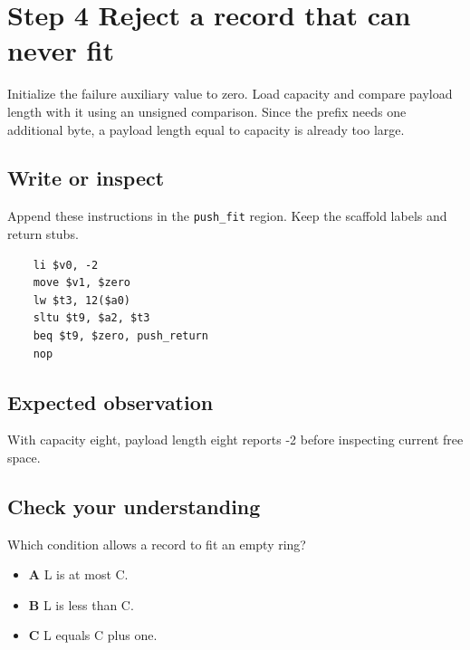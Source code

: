 \section{Step 4 Reject a record that can never fit}\label{ring-s04}

Initialize the failure auxiliary value to zero. Load capacity and compare payload length with it using an unsigned comparison. Since the prefix needs one additional byte, a payload length equal to capacity is already too large.

\subsection{Write or inspect}
Append these instructions in the \texttt{push\_fit} region. Keep the scaffold labels and return stubs.

\begin{verbatim}
    li $v0, -2
    move $v1, $zero
    lw $t3, 12($a0)
    sltu $t9, $a2, $t3
    beq $t9, $zero, push_return
    nop
\end{verbatim}

\subsection{Expected observation}
With capacity eight, payload length eight reports -2 before inspecting current free space.

\subsection{Check your understanding}
Which condition allows a record to fit an empty ring?

\begin{itemize}
  \item \textbf{A} L is at most C.
  \item \textbf{B} L is less than C.
  \item \textbf{C} L equals C plus one.
\end{itemize}
